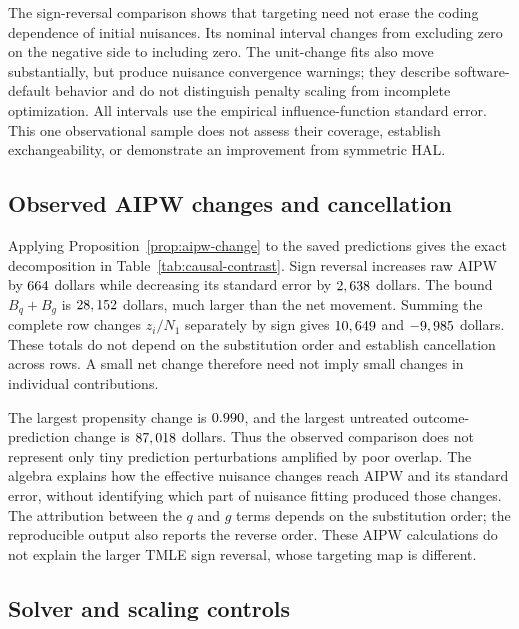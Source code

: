 \documentclass[11pt]{article}
\theoremstyle{definition}
\theoremstyle{remark}
\begin{document}
The sign-reversal comparison shows that targeting need not erase the
coding dependence of initial nuisances. Its nominal interval changes from
excluding zero on the negative side to including zero. The unit-change
fits also move substantially, but produce nuisance convergence warnings;
they describe software-default behavior and do not distinguish
penalty scaling from incomplete optimization. All intervals use the
empirical influence-function standard error. This one observational sample
does not assess their coverage, establish exchangeability, or demonstrate
an improvement from symmetric HAL.

\subsection{Observed AIPW changes and cancellation}

Applying Proposition~\ref{prop:aipw-change} to the saved predictions gives
the exact decomposition in Table~\ref{tab:causal-contrast}. Sign reversal
increases raw AIPW by $664$ dollars while decreasing its
standard error by $2,638$ dollars. The bound $B_q+B_g$ is
$28,152$ dollars, much larger than the net movement. Summing the
complete row changes $z_i/N_1$ separately by sign gives
$10,649$ and $-9,985$ dollars. These totals do not
depend on the substitution order and establish cancellation across rows.
A small net change therefore need not imply small changes in individual
contributions.

The largest propensity change is $0.990$, and the largest untreated
outcome-prediction change is $87,018$ dollars. Thus the observed
comparison does not represent only tiny prediction perturbations amplified
by poor overlap. The algebra explains how the effective nuisance changes
reach AIPW and its standard error, without identifying which part of nuisance
fitting produced those changes. The attribution between the $q$ and $g$
terms depends on the substitution order; the reproducible output also
reports the reverse order. These AIPW calculations do not explain the larger
TMLE sign reversal, whose targeting map is different.



\subsection{Solver and scaling controls}
\end{document}
